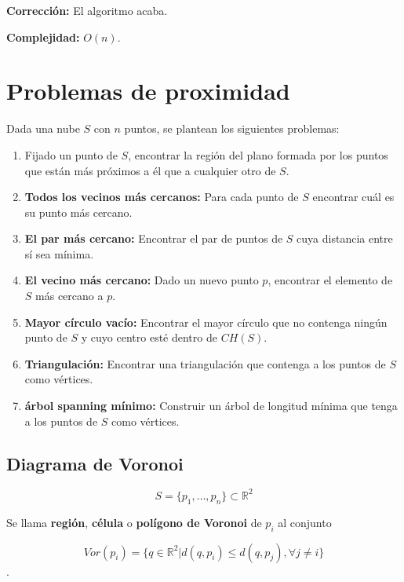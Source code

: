 \documentclass[twoside]{report}
\begin{document}
{\bf Corrección:} El algoritmo acaba.

{\bf Complejidad:} $O(n)$.

\section{Problemas de proximidad}

Dada una nube $S$ con $n$ puntos, se plantean los si\-guien\-tes
problemas:


\begin{enumerate}

  \item Fijado un punto de $S$, encontrar la región del plano
formada por los puntos que están más próximos a él que a cualquier
otro de $S$.

  \item \textbf{Todos los vecinos más cercanos:} Para cada punto de $S$ encontrar cuál es su punto más cercano.

  \item \textbf{El par más cercano:} Encontrar el par de puntos de $S$ cuya distancia entre sí sea mínima.

  \item \textbf{El vecino más cercano:} Dado un nuevo punto $p$,
encontrar el elemento de $S$ más cercano a $p$.

  \item \textbf{Mayor círculo vacío:} Encontrar el mayor círculo que no contenga ningún punto de $S$ y cuyo centro esté dentro de $CH(S)$.

  \item \textbf{Triangulación:} Encontrar una triangulación que contenga a los puntos de $S$ como vértices.

  \item \textbf{árbol spanning mínimo:} Construir un árbol de longitud mínima que tenga a los puntos de $S$ como vértices.

\end{enumerate}

\subsection{Diagrama de Voronoi}

$$S = \{ p_1, \dots ,p_n \} \subset \mathbb{R}^2$$

\begin{defi}Se llama \textbf{región}, \textbf{célula} o \textbf{polígono de Voronoi} de  $p_i$ al conjunto

\vspace{-0.2cm}

$$Vor(p_i)=\{q\in \mathbb{R}^2 | d(q,p_i) \leq d(q,p_j), \forall j \neq i \}$$.

\end{defi}
\end{document}
